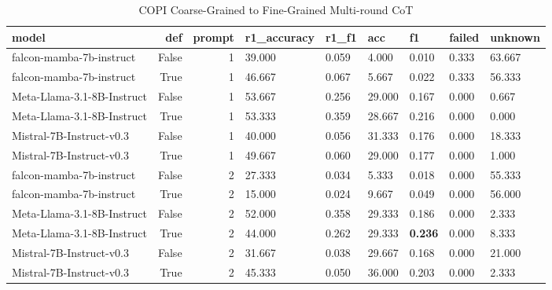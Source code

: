 \begin{table} [H]
\centering
\caption{COPI Coarse-Grained to Fine-Grained Multi-round CoT}
\begin{tabular}{lrrllllll}
\toprule
model & def & prompt & r1\_accuracy & r1\_f1 & acc & f1 & failed & unknown \\
\midrule
falcon-mamba-7b-instruct & False & 1 & 39.000 & 0.059 & 4.000 & 0.010 & 0.333 & 63.667 \\
falcon-mamba-7b-instruct & True & 1 & 46.667 & 0.067 & 5.667 & 0.022 & 0.333 & 56.333 \\
Meta-Llama-3.1-8B-Instruct & False & 1 & 53.667 & 0.256 & 29.000 & 0.167 & 0.000 & 0.667 \\
Meta-Llama-3.1-8B-Instruct & True & 1 & 53.333 & 0.359 & 28.667 & 0.216 & 0.000 & 0.000 \\
Mistral-7B-Instruct-v0.3 & False & 1 & 40.000 & 0.056 & 31.333 & 0.176 & 0.000 & 18.333 \\
Mistral-7B-Instruct-v0.3 & True & 1 & 49.667 & 0.060 & 29.000 & 0.177 & 0.000 & 1.000 \\
falcon-mamba-7b-instruct & False & 2 & 27.333 & 0.034 & 5.333 & 0.018 & 0.000 & 55.333 \\
falcon-mamba-7b-instruct & True & 2 & 15.000 & 0.024 & 9.667 & 0.049 & 0.000 & 56.000 \\
Meta-Llama-3.1-8B-Instruct & False & 2 & 52.000 & 0.358 & 29.333 & 0.186 & 0.000 & 2.333 \\
Meta-Llama-3.1-8B-Instruct & True & 2 & 44.000 & 0.262 & 29.333 & \textbf{0.236} & 0.000 & 8.333 \\
Mistral-7B-Instruct-v0.3 & False & 2 & 31.667 & 0.038 & 29.667 & 0.168 & 0.000 & 21.000 \\
Mistral-7B-Instruct-v0.3 & True & 2 & 45.333 & 0.050 & 36.000 & 0.203 & 0.000 & 2.333 \\
\bottomrule
\end{tabular}
\end{table}

